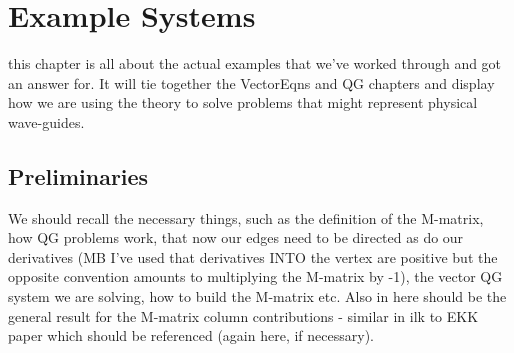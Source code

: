 \chapter{Example Systems} \label{ch:ExampleSystems}
this chapter is all about the actual examples that we've worked through and got an answer for.
It will tie together the VectorEqns and QG chapters and display how we are using the theory to solve problems that might represent physical wave-guides.

\section{Preliminaries}
We should recall the necessary things, such as the definition of the M-matrix, how QG problems work, that now our edges need to be directed as do our derivatives (MB I've used that derivatives INTO the vertex are positive but the opposite convention amounts to multiplying the M-matrix by -1), the vector QG system we are solving, how to build the M-matrix etc.
Also in here should be the general result for the M-matrix column contributions - similar in ilk to EKK paper which should be referenced (again here, if necessary). \newline

